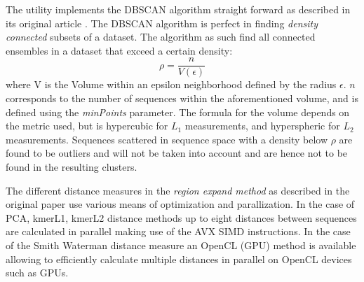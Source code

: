 The utility implements the DBSCAN algorithm straight forward as
described in its original article \cite{dbscan}. The DBSCAN algorithm
is perfect in finding \emph{density connected} subsets of a
dataset. The algorithm as such find all connected ensembles in a
dataset that exceed a certain density:
\begin{equation}
  \rho = \frac{n}{V(\epsilon)} \label{eqn-density}
\end{equation}
where V is the Volume within an epsilon neighborhood defined by the
radius $\epsilon$. $n$ corresponds to the number of sequences within
the aforementioned volume, and is defined using the \emph{minPoints}
parameter. The formula for the volume depends on the metric used, but
is hypercubic for $L_1$ measurements, and hyperspheric for $L_2$
measurements. Sequences scattered in sequence space with a density
below $\rho$ are found to be outliers and will not be taken into
account and are hence not to be found in the resulting clusters. 

The different distance measures in the \emph{region expand method} as
described in the original paper use various means of optimization and
parallization. In the case of PCA, kmerL1, kmerL2 distance methods up to eight
distances between sequences are calculated in parallel making use of
the AVX SIMD instructions. In the case of the Smith Waterman distance
measure an OpenCL (GPU) method is available allowing to efficiently calculate
multiple distances in parallel on OpenCL devices such as GPUs. 


